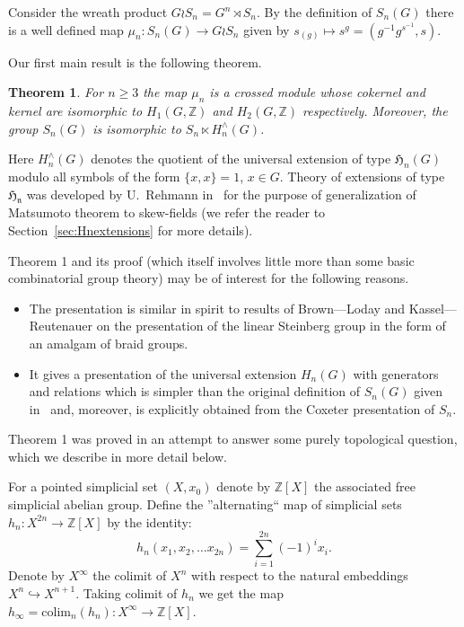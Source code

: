 \documentclass[oneside, 12pt]{amsart}
\theoremstyle{plain}
\newtheorem{thm}{Theorem}
\numberwithin{equation}{section}
\numberwithin{lemma}{section}
\theoremstyle{remark}
\theoremstyle{definition}
\newcommand{\ZZ}{\mathbb{Z}}
\begin{document}
Consider the wreath product $G \wr S_n = G^n \rtimes S_n$. 
By the definition of $S_n(G)$ there is a well defined map $\mu_n \colon S_n(G)\to G \wr S_n$ given by $s_{(g)} \mapsto s^g = (g^{-1} g^{s^{-1}}, s)$.

Our first main result is the following theorem. 
\begin{thm} \label{thm:summary} For $n \geq 3$ the map $\mu_n$ is a crossed module whose
 cokernel and kernel are isomorphic to $H_1(G, \ZZ)$ and $H_2(G, \ZZ)$ respectively.
Moreover, the group $S_n(G)$ is isomorphic to $S_n \ltimes H_n^\wedge(G)$. \end{thm}
Here $H_n^\wedge(G)$ denotes the quotient of the universal extension of type $\mathfrak{H}_n(G)$ 
modulo all symbols of the form $\{x, x\} = 1$, $x\in G$.
Theory of extensions of type $\mathfrak{H_n}$ was developed by U.~Rehmann in~\cite{Reh78}
 for the purpose of generalization of Matsumoto theorem to skew-fields (we refer the reader to Section~\ref{sec:Hnextensions} for more details).

Theorem 1 and its proof (which itself involves little more than some basic combinatorial group theory) may be of interest for the following reasons.
\begin{itemize}
 \item The presentation is similar in spirit to results of Brown---Loday and Kassel---Reutenauer on the presentation of 
   the linear Steinberg group in the form of an amalgam of braid groups. 
 \item It gives a presentation of the universal extension $H_n(G)$ with generators and relations which is simpler than the original definition of $S_n(G)$ given in~\cite{Reh78}
   and, moreover, is explicitly obtained from the Coxeter presentation of $S_n$.
\end{itemize}



Theorem 1 was proved in an attempt to answer some purely topological question, which we describe in more detail below.

For a pointed simplicial set $(X, x_0)$ denote by $\ZZ[X]$ the associated free simplicial abelian group.
Define the ''alternating`` map of simplicial sets $h_n\colon X^{2n} \to \ZZ[X]$ by the identity:
 \[h_n(x_1, x_2, \ldots x_{2n}) = \sum\limits_{i=1}^{2n}(-1)^ix_i.\]
Denote by $X^\infty$ the colimit of $X^n$ with respect to the natural embeddings $X^{n} \hookrightarrow X^{n+1}$.
Taking colimit of $h_n$ we get the map $h_\infty = \mathrm{colim}_n(h_n) \colon X^\infty \to \ZZ[X]$.
\end{document}
